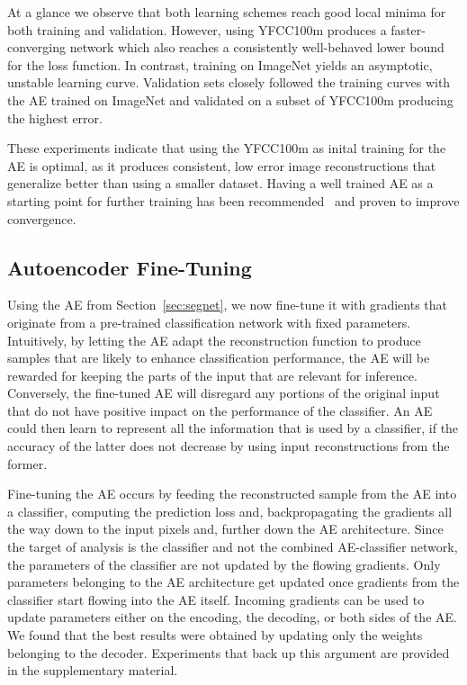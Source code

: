 \documentclass[10pt,twocolumn,a4paper]{article}
\begin{document}
At a glance we observe that both learning schemes reach good local minima for both training and validation.
However, using YFCC100m produces a faster-converging network which also reaches a consistently well-behaved lower bound for the loss function.
In contrast, training on ImageNet yields an asymptotic, unstable learning curve.
Validation sets closely followed the training curves with the AE trained on ImageNet and validated on a subset of YFCC100m producing the highest error.

These experiments indicate that using the YFCC100m as inital training for the AE is optimal, as it produces consistent, low error image reconstructions that generalize better than using a smaller dataset.
Having a well trained AE as a starting point for further training has been recommended~\cite{bengio2012practical, masci2011stacked} and proven to improve convergence.




\subsection{Autoencoder Fine-Tuning}

Using the AE from Section~\ref{sec:segnet}, we now fine-tune it with gradients that originate from a pre-trained classification network with fixed parameters.
Intuitively, by letting the AE adapt the reconstruction function to produce samples that are likely to enhance classification performance, the AE will be rewarded for keeping the parts of the input that are relevant for inference.
Conversely, the fine-tuned AE will disregard any portions of the original input that do not have positive impact on the performance of the classifier.
An AE could then learn to represent all the information that is used by a classifier, if the accuracy of the latter does not decrease by using input reconstructions from the former.

Fine-tuning the AE occurs by feeding the reconstructed sample from the AE into a classifier, computing the prediction loss and, backpropagating the gradients all the way down to the input pixels and, further down the AE architecture.
Since the target of analysis is the classifier and not the combined AE-classifier network, the parameters of the classifier are not updated by the flowing gradients.
Only parameters belonging to the AE architecture get updated once gradients from the classifier start flowing into the AE itself.
Incoming gradients can be used to update parameters either on the encoding, the decoding, or both sides of the AE.
We found that the best results were obtained by updating only the weights belonging to the decoder.
Experiments that back up this argument are provided in the supplementary material.
\end{document}
